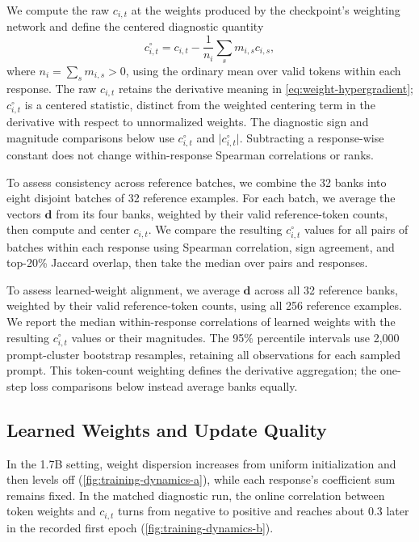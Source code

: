 \documentclass{article}
\theoremstyle{plain}
\theoremstyle{definition}
\theoremstyle{remark}
\begin{document}
We compute the raw \(c_{i,t}\) at the weights produced by the checkpoint's weighting network and define the centered diagnostic quantity
\begin{equation}
 c^\circ_{i,t}
 =c_{i,t}-\frac{1}{n_i}\sum_s m_{i,s}c_{i,s},
 \label{eq:checkpoint-centered-credit}
\end{equation}
where \(n_i=\sum_s m_{i,s}>0\), using the ordinary mean over valid tokens within each response. The raw \(c_{i,t}\) retains the derivative meaning in \cref{eq:weight-hypergradient}; \(c^\circ_{i,t}\) is a centered statistic, distinct from the weighted centering term in the derivative with respect to unnormalized weights. The diagnostic sign and magnitude comparisons below use \(c^\circ_{i,t}\) and \(\lvert c^\circ_{i,t}\rvert\). Subtracting a response-wise constant does not change within-response Spearman correlations or ranks.

To assess consistency across reference batches, we combine the 32 banks into eight disjoint batches of 32 reference examples. For each batch, we average the vectors \(\boldsymbol d\) from its four banks, weighted by their valid reference-token counts, then compute and center \(c_{i,t}\). We compare the resulting \(c^\circ_{i,t}\) values for all pairs of batches within each response using Spearman correlation, sign agreement, and top-20\% Jaccard overlap, then take the median over pairs and responses.

To assess learned-weight alignment, we average \(\boldsymbol d\) across all 32 reference banks, weighted by their valid reference-token counts, using all 256 reference examples. We report the median within-response correlations of learned weights with the resulting \(c^\circ_{i,t}\) values or their magnitudes. The 95\% percentile intervals use 2,000 prompt-cluster bootstrap resamples, retaining all observations for each sampled prompt. This token-count weighting defines the derivative aggregation; the one-step loss comparisons below instead average banks equally.

\subsection{Learned Weights and Update Quality}
\label{app:trained-credit}
\label{sec:credit-analysis}

In the 1.7B setting, weight dispersion increases from uniform initialization and then levels off (\cref{fig:training-dynamics-a}), while each response's coefficient sum remains fixed. In the matched diagnostic run, the online correlation between token weights and \(c_{i,t}\) turns from negative to positive and reaches about 0.3 later in the recorded first epoch (\cref{fig:training-dynamics-b}).
\end{document}
